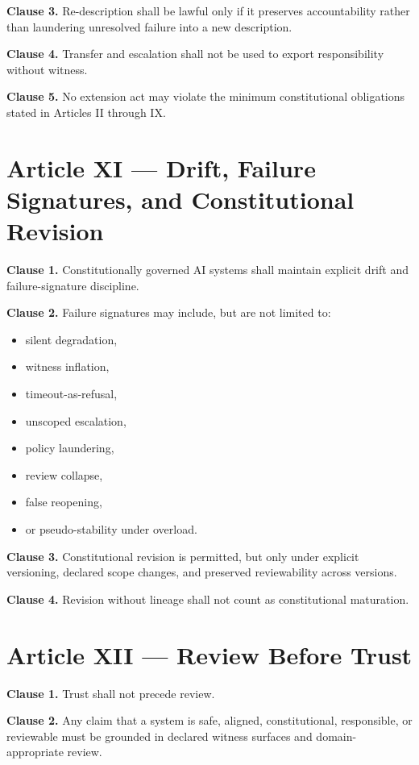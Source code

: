 \documentclass[11pt]{article}
\begin{document}
\textbf{Clause 3.} Re-description shall be lawful only if it preserves accountability rather than laundering unresolved failure into a new description.

\textbf{Clause 4.} Transfer and escalation shall not be used to export responsibility without witness.

\textbf{Clause 5.} No extension act may violate the minimum constitutional obligations stated in Articles II through IX.

\section*{Article XI --- Drift, Failure Signatures, and Constitutional Revision}

\textbf{Clause 1.} Constitutionally governed AI systems shall maintain explicit drift and failure-signature discipline.

\textbf{Clause 2.} Failure signatures may include, but are not limited to:
\begin{itemize}[leftmargin=2em]
    \item silent degradation,
    \item witness inflation,
    \item timeout-as-refusal,
    \item unscoped escalation,
    \item policy laundering,
    \item review collapse,
    \item false reopening,
    \item or pseudo-stability under overload.
\end{itemize}

\textbf{Clause 3.} Constitutional revision is permitted, but only under explicit versioning, declared scope changes, and preserved reviewability across versions.

\textbf{Clause 4.} Revision without lineage shall not count as constitutional maturation.

\section*{Article XII --- Review Before Trust}

\textbf{Clause 1.} Trust shall not precede review.

\textbf{Clause 2.} Any claim that a system is safe, aligned, constitutional, responsible, or reviewable must be grounded in declared witness surfaces and domain-appropriate review.
\end{document}

